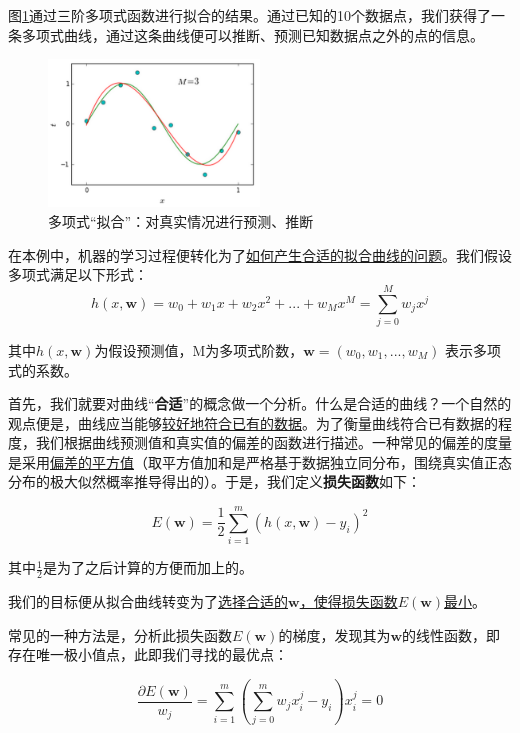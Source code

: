 图\ref{fig:polyfitting}通过三阶多项式函数进行拟合的结果。通过已知的10个数据点，我们获得了一条多项式曲线，通过这条曲线便可以推断、预测已知数据点之外的点的信息。

\begin{figure}[htbp]
   \centering
   \includegraphics[width=0.5\textwidth]{PolyFitting.png} %
   \caption{多项式“拟合”：对真实情况进行预测、推断}
   \label{fig:polyfitting}
\end{figure}

在本例中，机器的学习过程便转化为了\uline{如何产生合适的拟合曲线的问题}。我们假设多项式满足以下形式：
\begin{equation}
h(x,\mathbf{w}) = w_0 + w_1x + w_2x^2 + ... + w_Mx^M = \sum_{j=0}^M w_j x^j
\end{equation}

其中$h(x,\mathbf{w})$为假设预测值，M为多项式阶数，$\mathbf{w} = (w_0, w_1, ..., w_M)$ 表示多项式的系数。

首先，我们就要对曲线“\textbf{合适}”的概念做一个分析。什么是合适的曲线？一个自然的观点便是，曲线应当能够\uline{较好地符合已有的数据}。为了衡量曲线符合已有数据的程度，我们根据曲线预测值和真实值的偏差的函数进行描述。一种常见的偏差的度量是采用\uline{偏差的平方值}（取平方值加和是严格基于数据独立同分布，围绕真实值正态分布的极大似然概率推导得出的\cite{standford_machine_learning_cs229}）。于是，我们定义\textbf{损失函数}如下：

\begin{equation}
E(\mathbf{w}) = \dfrac{1}{2} \sum^m_{i=1} (h(x, \mathbf{w}) - y_i )^2
\end{equation}

其中$\frac{1}{2}$是为了之后计算的方便而加上的。

我们的目标便从拟合曲线转变为了\uline{选择合适的$\mathbf{w}$，使得损失函数$E(\mathbf{w})$最小}。

常见的一种方法是，分析此损失函数$E(\mathbf{w})$的梯度，发现其为$\mathbf{w}$的线性函数，即存在唯一极小值点，此即我们寻找的最优点：

\begin{equation}
\dfrac{\partial E(\mathbf{w})}{w_j} = \sum^m_{i=1} ( \sum^m_{j=0} w_j x^j_i - y_i ) x^j_i = 0
\end{equation}

